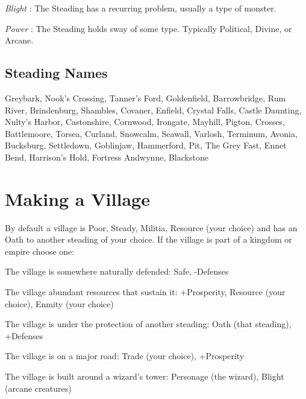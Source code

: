        

         {\em Blight} : The Steading has a recurring problem, usually a type of monster.

       

         {\em Power} : The Steading holds sway of some type. Typically Political, Divine, or Arcane.

       
\subsection{Steading Names}   
       

Greybark, Nook’s Crossing, Tanner’s Ford, Goldenfield, Barrowbridge, Rum River, Brindenburg, Shambles, Covaner, Enfield, Crystal Falls, Castle Daunting, Nulty's Harbor, Castonshire, Cornwood, Irongate, Mayhill, Pigton, Crosses, Battlemoore, Torsea, Curland, Snowcalm, Seawall, Varlosh, Terminum, Avonia, Bucksburg, Settledown, Goblinjaw, Hammerford, Pit, The Grey Fast, Ennet Bend, Harrison’s Hold, Fortress Andwynne, Blackstone

       
\section{Making a Village}   
       

By default a village is Poor, Steady, Militia, Resource (your choice) and has an Oath to another steading of your choice. If the village is part of a kingdom or empire choose one:

       
\startitemize[1,packed]
         
\item The village is somewhere naturally defended: Safe, -Defenses

         
\item The village abundant resources that sustain it: +Prosperity, Resource (your choice), Enmity (your choice)

         
\item The village is under the protection of another steading: Oath (that steading), +Defenses

         
\item The village is on a major road: Trade (your choice), +Prosperity

         
\item The village is built around a wizard's tower: Personage (the wizard), Blight (arcane creatures)

